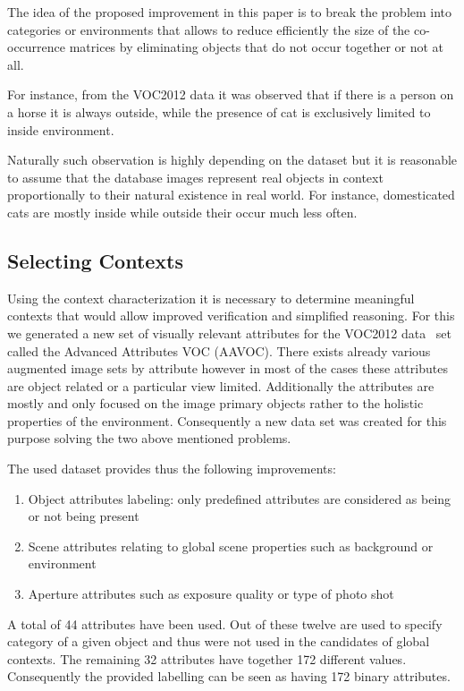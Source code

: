\documentclass[conference]{IEEEtran}
\begin{document}
The idea of the proposed improvement in this paper is to break the problem into categories or environments that allows to reduce efficiently the size of the co-occurrence matrices by eliminating objects that do not occur together or not at all. 

For instance, from the VOC2012 data it was observed that if there is a person on a horse it is always outside, while the presence of cat is exclusively limited to inside environment. 

Naturally such observation is highly depending on the dataset but it is reasonable to assume that the database images represent real objects in context proportionally to their natural existence in real world. For instance, domesticated cats are mostly inside while outside their occur much less often.   

\subsection{Selecting Contexts}

Using the context characterization it is necessary to determine meaningful contexts that would allow improved verification and simplified reasoning. For this we generated a new set of visually relevant attributes for the VOC2012 data~\cite{everingham:10} set called the Advanced Attributes VOC (AAVOC). There exists already various augmented image sets by attribute however in most of the cases these attributes are object related or a particular view limited. Additionally the attributes are mostly and only focused on the image primary objects rather to the holistic properties of the environment. Consequently a new data set was created for this purpose solving the two above mentioned problems. 

The used dataset provides thus the following improvements:
\begin{enumerate}
	\item Object attributes labeling: only predefined attributes are considered as being or not being present
	\item Scene attributes relating to global scene properties such as background or environment
	\item Aperture attributes such as exposure quality or type of photo shot
\end{enumerate}

A total of 44 attributes have been used. Out of these twelve are used to specify category of a given object and thus were not used in the candidates of global contexts. The remaining 32 attributes have together 172 different values. Consequently the provided labelling can be seen as having 172 binary attributes. 
\end{document}
